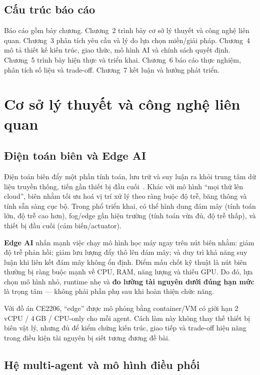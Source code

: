 \documentclass[12pt,a4paper,oneside]{report}
\begin{document}
\section{Cấu trúc báo cáo}

Báo cáo gồm bảy chương. Chương~2 trình bày cơ sở lý thuyết và công nghệ liên quan. Chương~3 phân tích yêu cầu và lý do lựa chọn miền/giải pháp. Chương~4 mô tả thiết kế kiến trúc, giao thức, mô hình AI và chính sách quyết định. Chương~5 trình bày hiện thực và triển khai. Chương~6 báo cáo thực nghiệm, phân tích số liệu và trade-off. Chương~7 kết luận và hướng phát triển.

\chapter{Cơ sở lý thuyết và công nghệ liên quan}

\section{Điện toán biên và Edge AI}

Điện toán biên đẩy một phần tính toán, lưu trữ và suy luận ra khỏi trung tâm dữ liệu truyền thống, tiến gần thiết bị đầu cuối~\cite{shi2016edge}. Khác với mô hình ``mọi thứ lên cloud'', biên nhằm tối ưu hoá vị trí xử lý theo ràng buộc độ trễ, băng thông và tính sẵn sàng cục bộ. Trong phổ triển khai, có thể hình dung đám mây (tính toán lớn, độ trễ cao hơn), fog/edge gần hiện trường (tính toán vừa đủ, độ trễ thấp), và thiết bị đầu cuối (cảm biến/actuator).

\textbf{Edge AI} nhấn mạnh việc chạy mô hình học máy ngay trên nút biên nhằm: giảm độ trễ phản hồi; giảm lưu lượng đẩy thô lên đám mây; và duy trì khả năng suy luận khi liên kết đám mây không ổn định. Điểm mấu chốt kỹ thuật là nút biên thường bị ràng buộc mạnh về CPU, RAM, năng lượng và thiếu GPU. Do đó, lựa chọn mô hình nhỏ, runtime nhẹ và \textbf{đo lường tài nguyên dưới đúng hạn mức} là trọng tâm --- không phải phần phụ sau khi hoàn thiện chức năng.

Với đồ án CE2206, ``edge'' được mô phỏng bằng container/VM có giới hạn 2\,vCPU / 4\,GB / CPU-only cho mỗi agent. Cách làm này không thay thế thiết bị biên vật lý, nhưng đủ để kiểm chứng kiến trúc, giao tiếp và trade-off hiệu năng trong điều kiện tài nguyên bị siết tương đương đề bài.

\section{Hệ multi-agent và mô hình điều phối}
\end{document}
